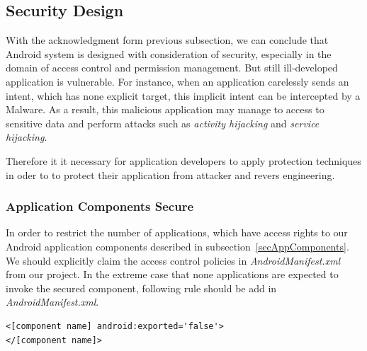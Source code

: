 \subsection{Security Design}
With the acknowledgment form previous subsection, we can conclude that Android system is designed with consideration of security, especially in the domain of access control and permission management. But still ill-developed application is vulnerable. For instance, when an application carelessly sends an intent, which has none explicit target, this implicit intent can be intercepted by a Malware. As a result, this malicious application may manage to access to sensitive data and perform attacks such as \emph{activity hijacking} and \emph{service hijacking}\cite{android_secure_inter}.

Therefore it it necessary for application developers to apply protection techniques  in oder to to protect their application from attacker and revers engineering. 
\subsubsection{Application Components Secure}
In order to restrict the number of applications, which have access rights to our Android application components described in subsection~\ref{secAppComponents}. We should explicitly claim the access control policies in \emph{AndroidManifest.xml} from our project. In the extreme case that none applications are expected to invoke the secured component, following rule should be add in \emph{AndroidManifest.xml}\cite{android_secure_cook}.
\begin{Verbatim}[fontsize=\relsize{-1},frame=lines,framesep=4mm, label=\fbox{\small\emph{Component Securing}}]
<[component name] android:exported='false'>
</[component name]>
\end{Verbatim} 
